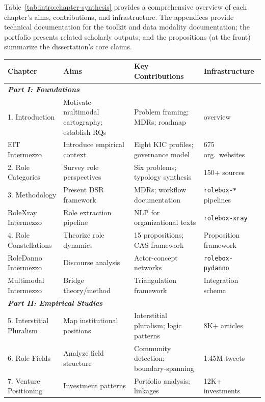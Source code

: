 \documentclass[../main.tex]{subfiles}
\begin{document}
Table~\ref{tab:intro:chapter-synthesis} provides a comprehensive overview of each chapter's aims, contributions, and infrastructure. The appendices provide technical documentation for the \RoleBox{} toolkit and data modality documentation; the portfolio presents related scholarly outputs; and the propositions (at the front) summarize the dissertation's core claims.

\begin{wideblock}
\centering
\scriptsize
\begin{tabularx}{0.95\textwidth}{@{}lXXX@{}}
\toprule
\textbf{Chapter} & \textbf{Aims} & \textbf{Key Contributions} & \textbf{Infrastructure} \\
\midrule
\multicolumn{4}{l}{\textit{\textbf{Part I: Foundations}}} \\[0.3em]
1. Introduction & Motivate multimodal cartography; establish RQs & Problem framing; MDRs; roadmap & \RoleBox{} overview \\[0.4em]
EIT Intermezzo & Introduce empirical context & Eight KIC profiles; governance model & 675 org.\ websites \\[0.4em]
2. Role Categories & Survey role perspectives & Six problems; typology synthesis & 150+ sources \\[0.4em]
3. Methodology & Present DSR framework & MDRs; workflow documentation & \texttt{rolebox-*} pipelines \\[0.4em]
RoleXray Intermezzo & Role extraction pipeline & NLP for organizational texts & \texttt{rolebox-xray} \\[0.4em]
4. Role Constellations & Theorize role dynamics & 15 propositions; CAS framework & Proposition framework \\[0.4em]
RoleDanno Intermezzo & Discourse analysis & Actor-concept networks & \texttt{rolebox-pydanno} \\[0.4em]
Multimodal Intermezzo & Bridge theory/method & Triangulation framework & Integration schema \\
\midrule
\multicolumn{4}{l}{\textit{\textbf{Part II: Empirical Studies}}} \\[0.3em]
5. Interstitial Pluralism & Map institutional positions & Interstitial pluralism; logic patterns & 8K+ articles \\[0.4em]
6. Role Fields & Analyze field structure & Community detection; boundary-spanning & 1.45M tweets \\[0.4em]
7. Venture Positioning & Investment patterns & Portfolio analysis; linkages & 12K+ investments \\[0.4em]

\end{tabularx}
\end{wideblock}
\end{document}

